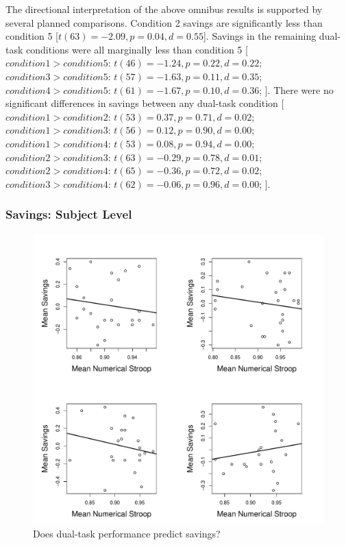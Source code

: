 The directional interpretation of the above omnibus results is supported by
several planned comparisons. 
Condition 2 savings are significantly less than condition 5 [$t(63) = -2.09, p =
0.04, d = 0.55$].
Savings in the remaining dual-task conditions were all marginally less than
condition 5 [
$condition  1 > condition  5$:
$t(46) = -1.24, p = 0.22, d = 0.22$;
$condition  3 > condition  5$:
$t(57) = -1.63, p = 0.11, d = 0.35$;
$condition  4 > condition  5$:
$t(61) = -1.67, p = 0.10, d = 0.36$;
].
There were no significant differences in savings between any dual-task condition [
$condition  1 > condition  2$:
$t(53) = 0.37, p = 0.71, d = 0.02$;
$condition  1 > condition  3$:
$t(56) = 0.12, p = 0.90, d = 0.00$;
$condition  1 > condition  4$:
$t(53) = 0.08, p = 0.94, d = 0.00$;
$condition  2 > condition  3$:
$t(63) = -0.29, p = 0.78, d = 0.01$;
$condition  2 > condition  4$:
$t(65) = -0.36, p = 0.72, d = 0.02$;
$condition  3 > condition  4$:
$t(62) = -0.06, p = 0.96, d = 0.00$;
].

\subsubsection*{Savings: Subject Level} 
\begin{figure}[t]
  \centering \includegraphics[width=1.0\textwidth]{../figures/fig_savings_dt.pdf}
  \caption{
    Does dual-task performance predict savings?
  }
  \label{fig:savings_dt}
\end{figure}

